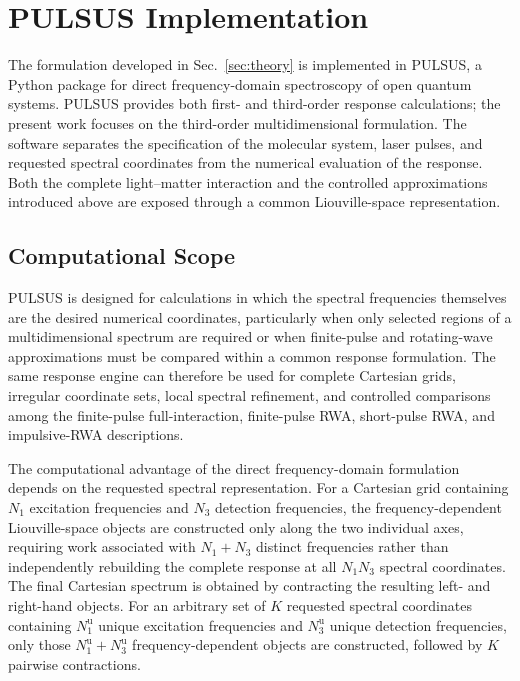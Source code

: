 \section{PULSUS Implementation}
\label{sec:software}

The formulation developed in Sec.~\ref{sec:theory} is implemented in
PULSUS, a Python package for direct frequency-domain spectroscopy of
open quantum systems. PULSUS provides both first- and third-order
response calculations; the present work focuses on the third-order
multidimensional formulation. The software separates the specification
of the molecular system, laser pulses, and requested spectral coordinates
from the numerical evaluation of the response. Both the complete
light--matter interaction and the controlled approximations introduced
above are exposed through a common Liouville-space representation.

\subsection{Computational Scope}

PULSUS is designed for calculations in which the spectral frequencies
themselves are the desired numerical coordinates, particularly when
only selected regions of a multidimensional spectrum are required or
when finite-pulse and rotating-wave approximations must be compared
within a common response formulation. The same response engine can
therefore be used for complete Cartesian grids, irregular coordinate
sets, local spectral refinement, and controlled comparisons among the
finite-pulse full-interaction, finite-pulse RWA, short-pulse RWA, and
impulsive-RWA descriptions.

The computational advantage of the direct frequency-domain formulation
depends on the requested spectral representation. For a Cartesian grid
containing $N_1$ excitation frequencies and $N_3$ detection frequencies,
the frequency-dependent Liouville-space objects are constructed only
along the two individual axes, requiring work associated with
$N_1+N_3$ distinct frequencies rather than independently rebuilding
the complete response at all $N_1N_3$ spectral coordinates. The final
Cartesian spectrum is obtained by contracting the resulting left- and
right-hand objects. For an arbitrary set of $K$ requested spectral
coordinates containing $N_1^{\mathrm{u}}$ unique excitation frequencies
and $N_3^{\mathrm{u}}$ unique detection frequencies, only those
$N_1^{\mathrm{u}}+N_3^{\mathrm{u}}$ frequency-dependent objects are
constructed, followed by $K$ pairwise contractions.

